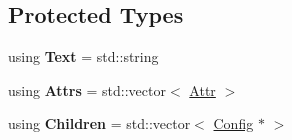 \subsection*{Protected Types}
\begin{DoxyCompactItemize}
\item 
\hypertarget{classtheoria_1_1config_1_1Config_ac1325f2d355e7c617dcd16d561ee2429}{using {\bfseries Text} = std\+::string}\label{classtheoria_1_1config_1_1Config_ac1325f2d355e7c617dcd16d561ee2429}

\item 
\hypertarget{classtheoria_1_1config_1_1Config_a3590578a57d530fe1e51d25b0e492f7d}{using {\bfseries Attrs} = std\+::vector$<$ \hyperlink{structtheoria_1_1config_1_1Config_1_1Attr}{Attr} $>$}\label{classtheoria_1_1config_1_1Config_a3590578a57d530fe1e51d25b0e492f7d}

\item 
\hypertarget{classtheoria_1_1config_1_1Config_acc6cccfd7dd23be9bbd053c55a1e8eb7}{using {\bfseries Children} = std\+::vector$<$ \hyperlink{classtheoria_1_1config_1_1Config}{Config} $\ast$ $>$}\label{classtheoria_1_1config_1_1Config_acc6cccfd7dd23be9bbd053c55a1e8eb7}

\end{DoxyCompactItemize}
